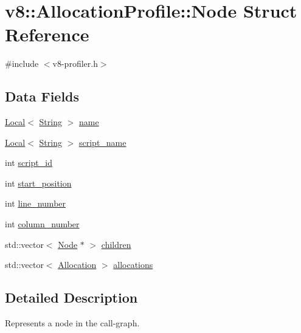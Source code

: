 \hypertarget{structv8_1_1AllocationProfile_1_1Node}{}\section{v8\+:\+:Allocation\+Profile\+:\+:Node Struct Reference}
\label{structv8_1_1AllocationProfile_1_1Node}


{\ttfamily \#include $<$v8-\/profiler.\+h$>$}

\subsection*{Data Fields}
\begin{DoxyCompactItemize}
\item 
\mbox{\hyperlink{classv8_1_1Local}{Local}}$<$ \mbox{\hyperlink{classv8_1_1String}{String}} $>$ \mbox{\hyperlink{structv8_1_1AllocationProfile_1_1Node_af9f2c323d6a11e836c02e8ac88adc5a8}{name}}
\item 
\mbox{\hyperlink{classv8_1_1Local}{Local}}$<$ \mbox{\hyperlink{classv8_1_1String}{String}} $>$ \mbox{\hyperlink{structv8_1_1AllocationProfile_1_1Node_acd6567ac06a0bae713390559128e9c62}{script\+\_\+name}}
\item 
int \mbox{\hyperlink{structv8_1_1AllocationProfile_1_1Node_a4a746de878d9ad42b32fda4c365b98fb}{script\+\_\+id}}
\item 
int \mbox{\hyperlink{structv8_1_1AllocationProfile_1_1Node_a6caceefbf826a0425adc74331cc7a910}{start\+\_\+position}}
\item 
int \mbox{\hyperlink{structv8_1_1AllocationProfile_1_1Node_ac9773c92a3af3a9a9420337599e68bd9}{line\+\_\+number}}
\item 
int \mbox{\hyperlink{structv8_1_1AllocationProfile_1_1Node_a7cf86acc298428c858673fc1f9dbe305}{column\+\_\+number}}
\item 
std\+::vector$<$ \mbox{\hyperlink{structv8_1_1AllocationProfile_1_1Node}{Node}} $\ast$ $>$ \mbox{\hyperlink{structv8_1_1AllocationProfile_1_1Node_a176673c0440cb1baaf7713e14da84db0}{children}}
\item 
std\+::vector$<$ \mbox{\hyperlink{structv8_1_1AllocationProfile_1_1Allocation}{Allocation}} $>$ \mbox{\hyperlink{structv8_1_1AllocationProfile_1_1Node_a6ee0934b35ba77fb5d8b53f02d5a3068}{allocations}}
\end{DoxyCompactItemize}


\subsection{Detailed Description}
Represents a node in the call-\/graph. 

